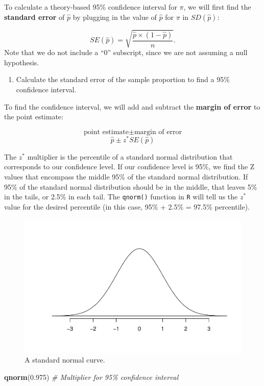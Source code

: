 \documentclass[
]{report}
\newenvironment{Shaded}{\begin{snugshade}}{\end{snugshade}}
\newcommand{\CommentTok}[1]{\textcolor[rgb]{0.56,0.35,0.01}{\textit{#1}}}
\newcommand{\FloatTok}[1]{\textcolor[rgb]{0.00,0.00,0.81}{#1}}
\newcommand{\FunctionTok}[1]{\textcolor[rgb]{0.13,0.29,0.53}{\textbf{#1}}}
\newcommand{\NormalTok}[1]{#1}
\providecommand{\tightlist}{%
  \setlength{\itemsep}{0pt}\setlength{\parskip}{0pt}}
\begin{document}
To calculate a theory-based 95\% confidence interval for \(\pi\), we will first find the \textbf{standard error} of \(\hat{p}\) by plugging in the value of \(\hat{p}\) for \(\pi\) in \(SD(\hat{p})\):

\[SE(\hat{p}) = \sqrt{\frac{\hat{p}\times(1-\hat{p})}{n}}.\]
Note that we do not include a ``0'' subscript, since we are not assuming a null hypothesis.

\begin{enumerate}
\def\labelenumi{\arabic{enumi}.}
\setcounter{enumi}{10}
\tightlist
\item
  Calculate the standard error of the sample proportion to find a 95\% confidence interval.
\end{enumerate}

\vspace{0.5in}

To find the confidence interval, we will add and subtract the \textbf{margin of error} to the point estimate:

\[\text{point estimate}\pm\text{margin of error}\]
\[\hat{p}\pm z^* SE(\hat{p})\]

The \(z^*\) multiplier is the percentile of a standard normal distribution that corresponds to our confidence level. If our confidence level is 95\%, we find the Z values that encompass the middle 95\% of the standard normal distribution. If 95\% of the standard normal distribution should be in the middle, that leaves 5\% in the tails, or 2.5\% in each tail. The \texttt{qnorm()} function in \texttt{R} will tell us the \(z^*\) value for the desired percentile (in this case, 95\% + 2.5\% = 97.5\% percentile).

\begin{figure}

{\centering \includegraphics[width=0.5\linewidth]{05-UR-module4_review_files/figure-latex/Ncurve-1} 

}

\caption{A standard normal curve.}\label{fig:Ncurve}
\end{figure}

\begin{Shaded}
\begin{Highlighting}[]
\FunctionTok{qnorm}\NormalTok{(}\FloatTok{0.975}\NormalTok{) }\CommentTok{\# Multiplier for 95\% confidence interval}
\end{Highlighting}
\end{Shaded}
\end{document}
